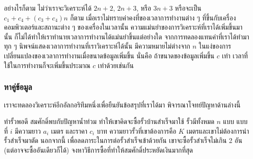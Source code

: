 อย่างไรก็ตาม ไม่ว่า{\wbr}เรา{\wbr}จะ{\wbr}วิเคราะห์{\wbr}ได้ $2n+2$, $2n+3$, หรือ $3n+3$ หรือ{\wbr}จะ{\wbr}เป็น{\wbr}
$c_1+c_4 + (c_3+c_4)n$ ก็ตาม เมื่อ{\wbr}เรา{\wbr}ไม่{\wbr}ทราบ{\wbr}ค่าคงที่{\wbr}ของ{\wbr}เวลา{\wbr}การ{\wbr}ทำงาน{\wbr}ต่าง ๆ
ที่{\wbr}ขึ้น{\wbr}กับ{\wbr}เครื่อง{\wbr}คอมพิวเตอร์{\wbr}และ{\wbr}สถานะ{\wbr}ต่าง ๆ ของ{\wbr}เครื่องใน{\wbr}เวลา{\wbr}นั้น{\wbr}
ความ{\wbr}แม่นยำ{\wbr}ของ{\wbr}การ{\wbr}วิเคราะห์{\wbr}ที่{\wbr}เรา{\wbr}ได้{\wbr}เพิ่ม{\wbr}ขึ้น{\wbr}มา{\wbr}นั้น{\wbr}
ก็{\wbr}ไม่{\wbr}ได้{\wbr}ทำ{\wbr}ให้{\wbr}เรา{\wbr}ทำนาย{\wbr}เวลา{\wbr}การ{\wbr}ทำงาน{\wbr}ได้{\wbr}แม่นยำ{\wbr}ขึ้น{\wbr}แต่อย่างใด{\wbr}
จาก{\wbr}การ{\wbr}ทดลอง{\wbr}แทน{\wbr}ค่า{\wbr}ที่{\wbr}เรา{\wbr}ได้{\wbr}ทำ{\wbr}มา ทุก ๆ นิพจน์{\wbr}แสดง{\wbr}เวลา{\wbr}การ{\wbr}ทำงาน{\wbr}ที่{\wbr}เรา{\wbr}วิเคราะห์{\wbr}ได้{\wbr}นั้น{\wbr}
มี{\wbr}ความหมาย{\wbr}ไม่{\wbr}ต่าง{\wbr}จาก $n$
ใน{\wbr}แง่{\wbr}ของ{\wbr}การ{\wbr}เปลี่ยนแปลง{\wbr}ของ{\wbr}เวลา{\wbr}การ{\wbr}ทำงาน{\wbr}เมื่อ{\wbr}ขนาด{\wbr}ข้อมูล{\wbr}เพิ่ม{\wbr}ขึ้น นั่น{\wbr}คือ{\wbr}
ถ้า{\wbr}ขนาด{\wbr}ของ{\wbr}ข้อมูล{\wbr}เพิ่ม{\wbr}ขึ้น $c$ เท่า เวลา{\wbr}ที่{\wbr}ใช้{\wbr}ใน{\wbr}การ{\wbr}ทำงาน{\wbr}ก็{\wbr}จะ{\wbr}เพิ่ม{\wbr}ขึ้น{\wbr}ประมาณ $c$
เท่า{\wbr}ด้วย{\wbr}เช่นกัน{\wbr}

\subsubsection{หาคู่{\wbr}ข้อมูล}

เรา{\wbr}จะ{\wbr}ทดลอง{\wbr}วิเคราะห์{\wbr}อีก{\wbr}อัล{\wbr}กอ{\wbr}ริ{\wbr}ทึม{\wbr}หนึ่ง{\wbr}เพื่อ{\wbr}ยืนยัน{\wbr}ข้อสรุป{\wbr}ที่{\wbr}เรา{\wbr}ได้{\wbr}มา พิจารณา{\wbr}โจทย์{\wbr}ปัญหา{\wbr}ด้าน{\wbr}ล่าง{\wbr}นี้{\wbr}

\begin{prob}{ทำ{\wbr}รั้ว{\wbr}พอดี}
สม{\wbr}ศักดิ์{\wbr}พบ{\wbr}กับ{\wbr}ปัญหา{\wbr}น้ำท่วม ทำ{\wbr}ให้{\wbr}เขา{\wbr}คิด{\wbr}จะ{\wbr}ซื้อ{\wbr}รั้ว{\wbr}บ้าน{\wbr}สำเร็จ{\wbr}มา{\wbr}ใช้ รั้ว{\wbr}มี{\wbr}ทั้งหมด $n$ แบบ แบบ{\wbr}ที่{\wbr}
$i$ มี{\wbr}ความ{\wbr}ยาว $a_i$ เมตร และ{\wbr}ราคา $c_i$ บาท ความ{\wbr}ยาว{\wbr}รั้ว{\wbr}ที่{\wbr}เขา{\wbr}ต้องการ{\wbr}คือ $K$
เมตร{\wbr}และ{\wbr}เขา{\wbr}ไม่{\wbr}ต้องการ{\wbr}นำ{\wbr}รั้ว{\wbr}สำเร็จ{\wbr}มา{\wbr}ตัด นอกจากนี้{\wbr}
เพื่อ{\wbr}ลด{\wbr}ภาระ{\wbr}ใน{\wbr}การ{\wbr}ต่อ{\wbr}รั้ว{\wbr}สำเร็จ{\wbr}เข้า{\wbr}ด้วย{\wbr}กัน เขา{\wbr}จะ{\wbr}ซื้อ{\wbr}รั้ว{\wbr}สำเร็จ{\wbr}ไม่{\wbr}เกิน 2 อัน{\wbr}
(แต่{\wbr}อาจ{\wbr}จะ{\wbr}ซื้อ{\wbr}อัน{\wbr}เดียว{\wbr}ก็ได้)  จง{\wbr}หา{\wbr}วิธีการ{\wbr}ซื้อ{\wbr}ที่{\wbr}ทำ{\wbr}ให้{\wbr}สม{\wbr}ศักดิ์{\wbr}ประหยัด{\wbr}เงิน{\wbr}มาก{\wbr}ที่สุด{\wbr}
\end{prob}

